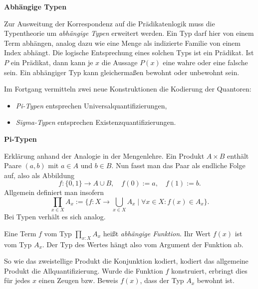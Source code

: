 \documentclass[8pt]{beamer}
\newcommand{\strong}[1]{\textsf{\textbf{#1}}}
\newcommand{\centerheadline}[1]{%
  \begin{center}\strong{#1}\end{center}}
\newcommand{\parspace}{\vspace{0.8em}}
\begin{document}
\begin{frame}
\centerheadline{Abhängige Typen}
\end{frame}

\begin{frame}
Zur Ausweitung der Korrespondenz auf die Prädikatenlogik
muss die Typentheorie um \emph{abhängige Typen} erweitert werden.
Ein Typ darf hier von einem Term abhängen, analog dazu wie eine
Menge als indizierte Familie von einem Index abhängt. Die logische
Entsprechung eines solchen Typs ist ein Prädikat. Ist $P$ ein
Prädikat, dann kann je $x$ die Aussage $P(x)$ eine wahre oder
eine falsche sein. Ein abhängiger Typ kann gleichermaßen bewohnt oder
unbewohnt sein.

\parspace
Im Fortgang vermitteln zwei neue Konstruktionen
die Kodierung der Quantoren:
\begin{itemize}
\item \emph{Pi-Typen} entsprechen Universalquantifizierungen,
\item \emph{Sigma-Typen} entsprechen Existenzquantifizierungen.
\end{itemize}
\end{frame}

\begin{frame}[t]
\strong{Pi-Typen}

\vspace{3em}
Erklärung anhand der Analogie in der Mengenlehre. Ein Produkt $A\times B$
enthält Paare $(a,b)$ mit $a\in A$ und $b\in B$. Nun fasst man das
Paar als endliche Folge auf, also als Abbildung
\[f\colon\{0,1\}\to A\cup B, \quad f(0):=a,\quad f(1):=b.\]\pause
Allgemein definiert man insofern
\[\prod_{x\in X} A_x := \{f\colon X\to\bigcup_{x\in X}A_x\mid
\forall x\in X\colon f(x)\in A_x\}.\]\pause
Bei Typen verhält es sich analog.

\parspace
Eine Term $f$ vom Typ $\prod_{x\colon X} A_x$ heißt \emph{abhängige Funktion}.
Ihr Wert $f(x)$ ist vom Typ $A_x$. Der Typ des Wertes hängt also vom Argument
der Funktion ab.\pause

\parspace
So wie das zweistellige Produkt die Konjunktion kodiert, kodiert
das allgemeine Produkt die Allquantifizierung. Wurde die Funktion $f$
konstruiert, erbringt dies für jedes $x$ einen Zeugen bzw. Beweis $f(x)$,
dass der Typ $A_x$ bewohnt ist.
\end{frame}
\end{document}
